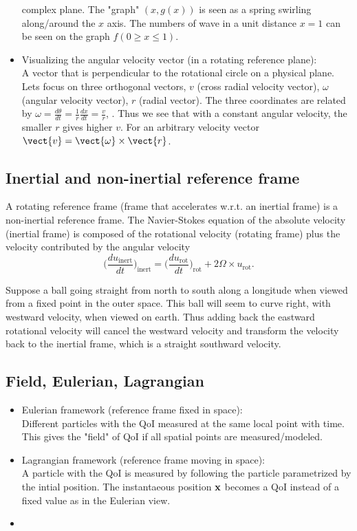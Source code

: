 \begin{itemize}
complex plane.  The "graph" $(x,g(x))$ is seen as a spring swirling along/around the $x$ axis.  The
numbers of wave in a unit distance $x=1$ can be seen on the graph $f(0 \ge x \le 1)$.  \item
Visualizing the angular velocity vector (in a rotating reference plane): \\ A vector that is
perpendicular to the rotational circle on a physical plane.  Lets focus on three orthogonal vectors,
$v$ (cross radial velocity vector), $\omega$ (angular velocity vector), $r$ (radial vector).  The
three coordinates are related by $\omega = \frac{d\theta}{dt} = \frac{1}{r}\frac{dx}{dt} =
\frac{v}{r}$, .  Thus we see that with a constant angular velocity, the smaller $r$ gives higher
$v$.  For an arbitrary velocity vector $\vect{v} = \vect{\omega} \times \vect{r}$.  \end{itemize}

\subsection{Inertial and non-inertial reference frame} A rotating reference frame (frame that
accelerates w.r.t. an inertial frame) is a non-inertial reference frame.  The Navier-Stokes equation
of the absolute velocity (inertial frame) is composed of the rotational velocity (rotating frame)
plus the velocity contributed by the angular velocity \begin{equation}
\Big(\frac{du_{\text{inert}}}{dt}\Big)_{\text{inert}} =
\Big(\frac{du_{\text{rot}}}{dt}\Big)_{\text{rot}} + 2\Omega \times u_{\text{rot}}.  \end{equation}
\begin{exmp} Suppose a ball going straight from north to south along a longitude when viewed from a
fixed point in the outer space.  This ball will seem to curve right, with westward velocity, when
viewed on earth.  Thus adding back the eastward rotational velocity will cancel the westward
velocity and transform the velocity back to the inertial frame, which is a straight southward
velocity.  \end{exmp}

\subsection{Field, Eulerian, Lagrangian} \begin{itemize} \item Eulerian framework (reference frame
fixed in space): \\ Different particles with the QoI measured at the same local point with time.
This gives the "field" of QoI if all spatial points are measured/modeled.  \item Lagrangian
framework (reference frame moving in space): \\ A particle with the QoI is measured by following the
particle parametrized by the intial position.  The instantaeous position $\bf{x}$ becomes a QoI
instead of a fixed value as in the Eulerian view.  \item \end{itemize}



